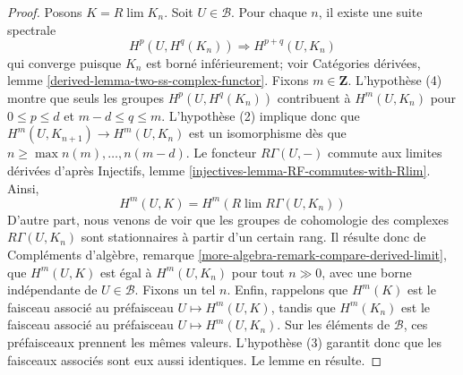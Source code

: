 \begin{proof}
Posons $K = R\lim K_n$. Soit $U \in \mathcal{B}$. Pour chaque $n$, il existe
une suite spectrale
$$
H^p(U, H^q(K_n)) \Rightarrow H^{p + q}(U, K_n)
$$
qui converge puisque $K_n$ est borné inférieurement; voir
Catégories dérivées, lemme \ref{derived-lemma-two-ss-complex-functor}.
Fixons $m \in \mathbf{Z}$. L'hypothèse (4) montre que seuls les groupes
$H^p(U, H^q(K_n))$ contribuent à $H^m(U, K_n)$ pour
$0 \leq p \leq d$ et $m - d \leq q \leq m$.
L'hypothèse (2) implique donc que
$H^m(U, K_{n + 1}) \to H^m(U, K_n)$ est un isomorphisme dès que
$n \geq \max{n(m), \ldots, n(m - d)}$. Le foncteur $R\Gamma(U, -)$
commute aux limites dérivées d'après
Injectifs, lemme \ref{injectives-lemma-RF-commutes-with-Rlim}.
Ainsi,
$$
H^m(U, K) = H^m(R\lim R\Gamma(U, K_n))
$$
D'autre part, nous venons de voir que les groupes de cohomologie des
complexes $R\Gamma(U, K_n)$ sont stationnaires à partir d'un certain rang.
Il résulte donc de Compléments d'algèbre, remarque
\ref{more-algebra-remark-compare-derived-limit}, que $H^m(U, K)$ est égal
à $H^m(U, K_n)$ pour tout $n \gg 0$, avec une borne indépendante de
$U \in \mathcal{B}$. Fixons un tel $n$. Enfin, rappelons que $H^m(K)$
est le faisceau associé au préfaisceau $U \mapsto H^m(U, K)$, tandis que
$H^m(K_n)$ est le faisceau associé au préfaisceau
$U \mapsto H^m(U, K_n)$. Sur les éléments de $\mathcal{B}$, ces
préfaisceaux prennent les mêmes valeurs. L'hypothèse (3) garantit donc
que les faisceaux associés sont eux aussi identiques. Le lemme en résulte.
\end{proof}

